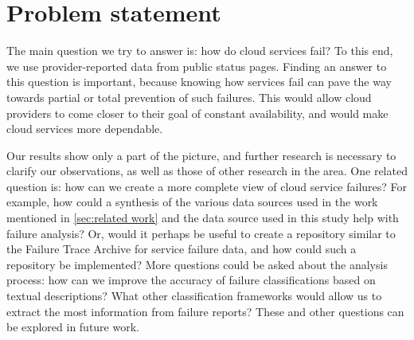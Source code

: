 \section{Problem statement}
The main question we try to answer is: how do cloud services fail?
To this end, we use provider-reported data from public status pages.
Finding an answer to this question is important, because knowing how services fail can pave the way towards partial or total prevention of such failures.
This would allow cloud providers to come closer to their goal of constant availability, and would make cloud services more dependable.

Our results show only a part of the picture, and further research is necessary to clarify our observations, as well as those of other research in the area.
One related question is: how can we create a more complete view of cloud service failures?
For example, how could a synthesis of the various data sources used in the work mentioned in \autoref{sec:related work} and the data source used in this study help with failure analysis?
Or, would it perhaps be useful to create a repository similar to the Failure Trace Archive \cite{javadi2013} for service failure data, and how could such a repository be implemented?
More questions could be asked about the analysis process: how can we improve the accuracy of failure classifications based on textual descriptions?
What other classification frameworks would allow us to extract the most information from failure reports?
These and other questions can be explored in future work.
